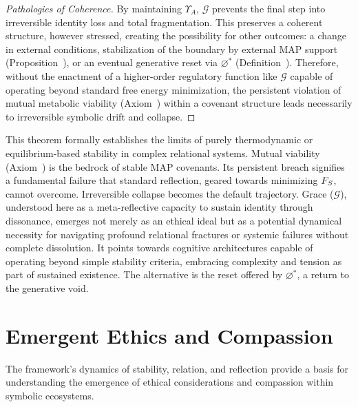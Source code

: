 \begin{proof}[Pathologies of Coherence]
By maintaining $\Upsilon_A$, $\mathcal{G}$ prevents the final step into irreversible identity loss and total fragmentation. This preserves a coherent structure, however stressed, creating the possibility for other outcomes: a change in external conditions, stabilization of the boundary by external MAP support (Proposition~), or an eventual generative reset via $\varnothing^*$ (Definition~).
Therefore, without the enactment of a higher-order regulatory function like $\mathcal{G}$ capable of operating beyond standard free energy minimization, the persistent violation of mutual metabolic viability (Axiom~) within a covenant structure leads necessarily to irreversible symbolic drift and collapse.
\end{proof}
\begin{scholium}
\label{sch:bk9_flexible_goal_calibration}
This theorem formally establishes the limits of purely thermodynamic or equilibrium-based stability in complex relational systems. Mutual viability (Axiom~) is the bedrock of stable MAP covenants. Its persistent breach signifies a fundamental failure that standard reflection, geared towards minimizing $F_S$, cannot overcome. Irreversible collapse becomes the default trajectory. Grace ($\mathcal{G}$), understood here as a meta-reflective capacity to sustain identity through dissonance, emerges not merely as an ethical ideal but as a potential dynamical necessity for navigating profound relational fractures or systemic failures without complete dissolution. It points towards cognitive architectures capable of operating beyond simple stability criteria, embracing complexity and tension as part of sustained existence. The alternative is the reset offered by $\varnothing^*$, a return to the generative void.
\end{scholium}
\section{Emergent Ethics and Compassion}
\label{sec:bk9_emergence_ethics_and_compassion}
The framework's dynamics of stability, relation, and reflection provide a basis for understanding the emergence of ethical considerations and compassion within symbolic ecosystems.
